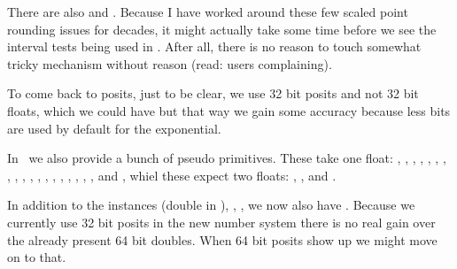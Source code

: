 \startpacked\darkblue \tttf \getbuffer \stoppacked

There are also \typ {\ifintervalfloat} and \typ{\ifintervalnum}. Because I have
worked around these few scaled point rounding issues for decades, it might
actually take some time before we see the interval tests being used in \CONTEXT.
After all, there is no reason to touch somewhat tricky mechanism without reason
(read: users complaining).

To come back to posits, just to be clear, we use 32 bit posits and not 32 bit
floats, which we could have but that way we gain some accuracy because less bits
are used by default for the exponential.

In \CONTEXT\ we also provide a bunch of pseudo primitives. These take one float:
\type {\pfsin}, \type {\pfcos}, \type {\pftan}, \type {\pfasin}, \type {\pfacos},
\type {\pfatan}, \type {\pfsinh}, \type {\pfcosh}, \type {\pftanh}, \type
{\pfasinh}, \type {\pfacosh}, \type {\pfatanh}, \type {\pfsqrt}, \type {\pflog},
\type {\pfexp}, \type {\pfceil}, \type {\pffloor}, \type {\pfround}, \type
{\pfabs}, \type {\pfrad} and \type {\pfdeg}, whiel these expect two floats: \type
{\pfatantwo}, \type {\pfpow}, \type {\pfmod} and \type {\pfrem}.


\stopsectionlevel

\startsectionlevel[title=\METAPOST]

In addition to the instances  (double in \LMTX), ,
,  we now also have . Because we
currently use 32 bit posits in the new number system there is no real gain over
the already present 64 bit doubles. When 64 bit posits show up we might move on
to that.

\stopsectionlevel

\stopdocument
